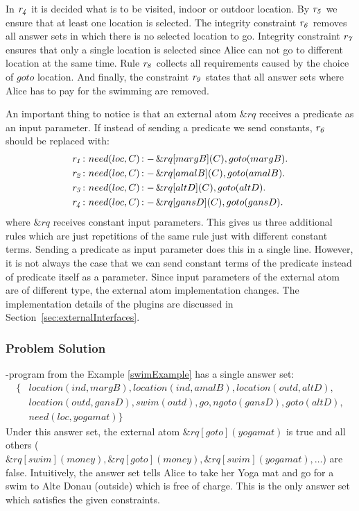 \documentclass[a4paper, titlepage]{article}
\newcommand{\ext}[3]{\ensuremath{\&{#1}[#2](#3)}}
\DeclareMathOperator{\leftimpl}{:-}
\newcommand{\row}[1]{%
  \ensuremath{\it \color{black} #1 \color{black}}%
}
\begin{document}
In $\row{r_4}$ it is decided what is to be visited, indoor or 
outdoor location. By $\row{r_5}$ we ensure that at least one location is selected. The integrity constraint $\row{r_6}$ removes all answer sets in which there is no selected location to go. Integrity constraint $\row{r_7}$ ensures that only a single location is selected since Alice can not go to different location at the same time. Rule $\row{r_8}$ collects all requirements caused by 
the choice of $\mathit{goto}$ location. And finally, the constraint $\row{r_9}$ states that all answer sets where 
Alice has to pay for the swimming are removed.

An important thing to notice is that an external atom 
$\mathit{\&rq}$ receives a predicate as an input parameter. If instead of sending a predicate we send 
constants, $\row{r_6}$ should be replaced with:
\begin{align*}
\row{r_1}\colon& need(loc, C) \leftimpl \ext{rq}{margB}{C}, 
goto(margB).\\
\row{r_2}\colon& need(loc, C) \leftimpl \ext{rq}{amalB}{C}, 
goto(amalB).\\
\row{r_3}\colon& need(loc, C) \leftimpl \ext{rq}{altD}{C}, 
goto(altD).\\
\row{r_4}\colon& need(loc, C) \leftimpl \ext{rq}{gansD}{C}, 
goto(gansD).
\end{align*}    
where $\&rq$ receives constant input parameters. This gives us three additional rules which are just 
repetitions of the same rule just with different constant 
terms. Sending a predicate as input parameter does this in a 
single line. However, it is not always the case that we can send constant terms of the predicate instead of predicate itself  as a parameter. Since input parameters of the external atom are of different type, the external atom implementation changes. The implementation details of the plugins are discussed in Section~\ref{sec:externalInterfaces}.

\subsubsection{Problem Solution}
\hex{}-program from the Example \ref{swimExample} has a 
single answer set:
\begin{align*}
\{ & 
location(ind,margB),location(ind,amalB),location(outd,altD), 
\\
& location(outd,gansD), 
swim(outd),go,ngoto(gansD),goto(altD),\\
& need(loc,yogamat) \} 
\end{align*}
Under this answer set, the external atom $\ext{rq}{goto}
{yogamat}$ is true and all others ($\ext{rq}{swim}
{money}, \ext{rq}{goto}{money}, \ext{rq}{swim}{yogamat}, 
\dots $) are false. Intuitively, the answer set tells Alice to 
take her Yoga mat and go for a swim to Alte Donau (outside) 
which is free of charge. This is the only answer set which 
satisfies the given constraints.    
\end{document}
